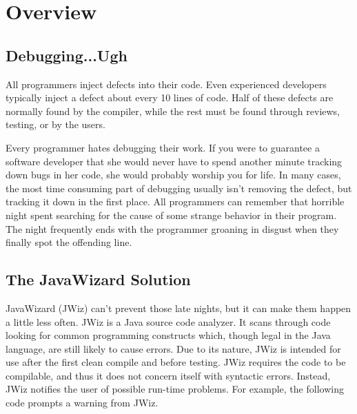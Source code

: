 
\chapter{Overview}
\section{Debugging...Ugh}
All programmers inject defects into their code. Even experienced developers
typically inject a defect about every 10 lines of code\cite{Humphrey95}.  %
Half of these defects are normally found by the compiler, while the rest
must be found through reviews, testing, or by the users.

Every programmer hates debugging their work.  If you were to guarantee a
software developer that she would never have to spend another minute
tracking down bugs in her code, she would probably worship you for life.
In many cases, the most time consuming part of debugging usually isn't
removing the defect, but tracking it down in the first place.  All
programmers can remember that horrible night spent searching for the cause
of some strange behavior in their program.  The night frequently ends with
the programmer groaning in disgust when they finally spot the offending
line.

\section{The JavaWizard Solution}
JavaWizard (JWiz) can't prevent those late nights, but it can make them
happen a little less often.  JWiz is a Java source code analyzer.  It scans
through code looking for common programming constructs which, though legal
in the Java language, are still likely to cause errors.  Due to its nature,
JWiz is intended for use after the first clean compile and before testing.
JWiz requires the code to be compilable, and thus it does not concern
itself with syntactic errors.  Instead, JWiz notifies the user of possible
run-time problems.  For example, the following code prompts a warning from
JWiz.


